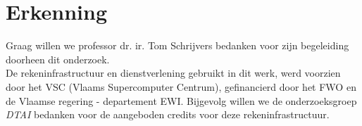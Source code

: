 \documentclass{article}
\begin{document}
\section*{Erkenning}
Graag willen we {professor dr. ir. Tom Schrijvers} bedanken voor zijn begeleiding doorheen dit onderzoek.\\
De rekeninfrastructuur en dienstverlening gebruikt in dit werk, werd voorzien door het VSC (Vlaams Supercomputer Centrum), gefinancierd door het FWO en de Vlaamse regering - departement EWI.
Bijgevolg willen we de onderzoeksgroep \textit{DTAI} bedanken voor de aangeboden credits voor deze rekeninfrastructuur.



\end{document}
